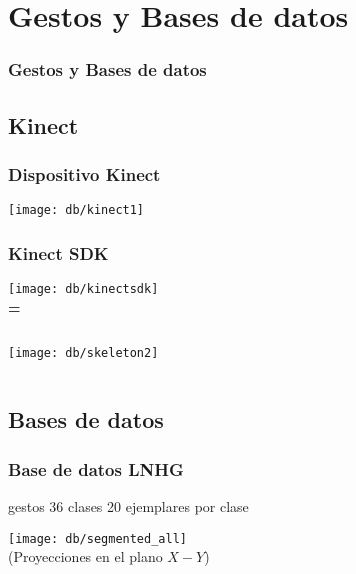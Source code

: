 \section{Gestos y Bases de datos} 

\begin{frame}
\frametitle{Gestos y Bases de datos}
\graphictocdb
\end{frame}

\subsection{Kinect}

\begin{myframe}
\frametitle{Dispositivo Kinect}

\begin{center}
  \texttt{[image: db/kinect1]}
\end{center}

\end{myframe}

\begin{myframe}
\frametitle{Kinect SDK}
\begin{center}
  \texttt{[image: db/kinectsdk]} \\
  {\huge \textbf{=}} \\
  \begin{columns}
  \begin{column}{0.7\textwidth}
    \centering
    \texttt{[image: db/skeleton2]}
  \end{column}
  \begin{column}{0.3\textwidth}
      \centering
      \vspace{-20pt}
  \end{column}
  \end{columns}
\end{center}
\end{myframe}

\subsection{Bases de datos}

\begin{myframe}
\frametitle{Base de datos LNHG}
\centering
\begin{block}{}
 gestos \hspace{1em} 36 clases \hspace{1em} 20 ejemplares por clase
\end{block}
\texttt{[image: db/segmented\_all]}\\
(Proyecciones en el plano $X-Y$)

\end{myframe}

